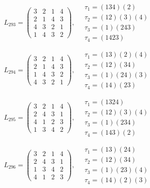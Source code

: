 $L_{293} = \begin{pmatrix} 3 & 2 & 1 & 4 \\ 2 & 1 & 4 & 3 \\ 4 & 3 & 2 & 1 \\ 1 & 4 & 3 & 2 \end{pmatrix}, \quad \begin{matrix} \tau_{1} = (1 3 4)(2) \\ \tau_{2} = (1 2)(3)(4) \\ \tau_{3} = (1)(2 4 3) \\ \tau_{4} = (1 4 2 3) \end{matrix}$

$L_{294} = \begin{pmatrix} 3 & 2 & 1 & 4 \\ 2 & 1 & 4 & 3 \\ 1 & 4 & 3 & 2 \\ 4 & 3 & 2 & 1 \end{pmatrix}, \quad \begin{matrix} \tau_{1} = (1 3)(2)(4) \\ \tau_{2} = (1 2)(3 4) \\ \tau_{3} = (1)(2 4)(3) \\ \tau_{4} = (1 4)(2 3) \end{matrix}$

$L_{295} = \begin{pmatrix} 3 & 2 & 1 & 4 \\ 2 & 4 & 3 & 1 \\ 4 & 1 & 2 & 3 \\ 1 & 3 & 4 & 2 \end{pmatrix}, \quad \begin{matrix} \tau_{1} = (1 3 2 4) \\ \tau_{2} = (1 2)(3)(4) \\ \tau_{3} = (1)(2 3 4) \\ \tau_{4} = (1 4 3)(2) \end{matrix}$

$L_{296} = \begin{pmatrix} 3 & 2 & 1 & 4 \\ 2 & 4 & 3 & 1 \\ 1 & 3 & 4 & 2 \\ 4 & 1 & 2 & 3 \end{pmatrix}, \quad \begin{matrix} \tau_{1} = (1 3)(2 4) \\ \tau_{2} = (1 2)(3 4) \\ \tau_{3} = (1)(2 3)(4) \\ \tau_{4} = (1 4)(2)(3) \end{matrix}$

